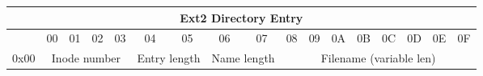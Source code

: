 \scriptsize
\begin{tabular}{|r||c|c|c|c|c|c|c|c||c|c|c|c|c|c|c|c|}
\hline
\multicolumn{17}{|c|}{Ext2 Directory Entry}
  \\ \hline\hline
 & 00 & 01 & 02 & 03 & 04 & 05 & 06 & 07 & 08 &
   09 & 0A & 0B & 0C & 0D & 0E & 0F \\ \hline
0x00 & \multicolumn{4}{c|}{Inode number} &
   \multicolumn{2}{c|}{Entry length} &
   \multicolumn{2}{c||}{Name length} &
   \multicolumn{8}{c|}{Filename (variable len)} \\ \hline
\end{tabular}
\normalsize












